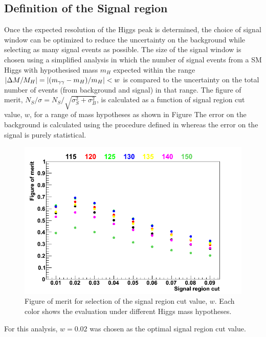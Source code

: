 \subsection{Definition of the Signal region}

Once the expected resolution of the Higgs peak is determined, the choice of signal window can be optimized
to reduce the uncertainty on the background while selecting as many signal events as possible.
The size of the signal window is chosen using a simplified analysis in which the number of signal events
from a SM Higgs with hypothesised mass $m_{H}$ expected within the range $|\Delta M/M_{H}|=|(m_{\gamma\gamma}-m_{H})/m_{H}| < w$ 
is compared to the uncertainty on the total number of events (from background and signal) in that range.
The figure of merit, $N_{S}/\sigma = N_{S}/\sqrt{\sigma_{S}^{2} + \sigma_{B}^{2}}$, is calculated as
a function of signal region cut value, $w$, for a range of mass hypotheses as shown in Figure
The error on the background is calculated using the procedure defined in whereas the error on the signal is 
purely statistical.

\begin{figure}
 \begin{centering}
  \includegraphics[width=\textwidth]{hgg7TeV/sidebandMvaPlots/fom.png}
 \end{centering}
  \caption{Figure of merit for selection of the signal region cut value, $w$. Each color shows the evaluation
  under different Higgs mass hypotheses.}
  \label{fig:sigwindowopt}
\end{figure}

For this analysis, $w=0.02$ was chosen as the optimal signal region cut value.

